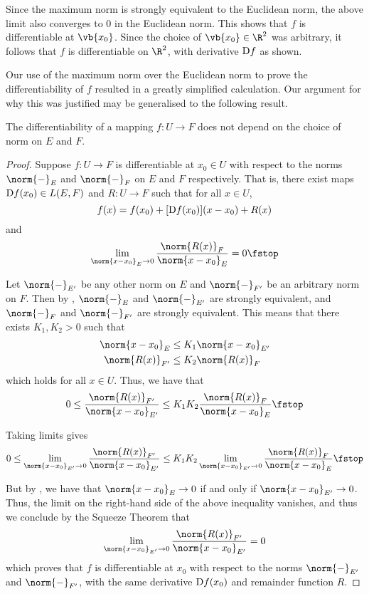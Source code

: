 Since the maximum norm is strongly equivalent to the Euclidean norm, the above limit also converges to 0 in the Euclidean norm. This shows that \( f \) is differentiable at \( \vb{x_0} \). Since the choice of \( \vb{x_0}\in\R^2 \) was arbitrary, it follows that \( f \) is differentiable on \( \R^2 \), with derivative \( \text{D} f \) as  shown.

\vspace{3mm}

Our use of the maximum norm over the Euclidean norm to prove the differentiability of \( f \) resulted in a greatly simplified calculation. Our argument for why this was justified may be generalised to the following result.

\begin{proposition}
  \label{thm:diff-norm-inv}
  The differentiability of a mapping \( f:U\to F \) does not depend on the choice of norm on \( E \) and \( F \).
\end{proposition}
\begin{proof}
  Suppose \( f:U\to F \) is differentiable at \( x_0\in U \) with respect to the norms \( \norm{-}_E \) and \( \norm{-}_F \) on \( E \) and \( F \) respectively. That is, there exist maps \( \text{D} f(x_0)\in L(E,F) \) and \( R:U\to F \) such that for all \( x\in U \),
  \[ f(x)=f(x_0)+[\text{D} f(x_0)](x-x_0)+R(x) \]
  and
  \[ \lim_{\norm{x-x_0}_E\to 0}\frac{\norm{R(x)}_F}{\norm{x-x_0}_E}=0\fstop \]

  Let \( \norm{-}_{E'} \) be any other norm on \( E \) and \( \norm{-}_{F'} \) be an arbitrary norm on \( F \). Then by , \( \norm{-}_E\) and \( \norm{-}_{E'} \) are strongly equivalent, and \( \norm{-}_F \) and \( \norm{-}_{F'} \) are strongly equivalent. This means that there exists \( K_1,K_2>0 \) such that
  \begin{align*}
    \norm{x-x_0}_E&\leq K_1\norm{x-x_0}_{E'}\\
    \norm{R(x)}_{F'}&\leq K_2\norm{R(x)}_F
  \end{align*}
  which holds for all \( x\in U \). Thus, we have that
  \[ 0\leq \frac{\norm{R(x)}_{F'}}{\norm{x-x_0}_{E'}}\leq K_1K_2\frac{\norm{R(x)}_F}{\norm{x-x_0}_E}\fstop \]

  Taking limits gives
  \[  0\leq \lim_{\norm{x-x_0}_{E'}\to 0}\frac{\norm{R(x)}_{F'}}{\norm{x-x_0}_{E'}}\leq K_1K_2\lim_{\norm{x-x_0}_{E'}\to 0}\frac{\norm{R(x)}_F}{\norm{x-x_0}_E}\fstop \]

  But by , we have that \( \norm{x-x_0}_E\to 0 \) if and only if \( \norm{x-x_0}_{E'}\to 0 \). Thus, the limit on the right-hand side of the above inequality vanishes, and thus we conclude by the Squeeze Theorem that
  \[ \lim_{\norm{x-x_0}_{E'}\to 0}\frac{\norm{R(x)}_{F'}}{\norm{x-x_0}_{E'}}=0 \]
  which proves that \( f \) is differentiable at \( x_0 \) with respect to the norms \( \norm{-}_{E'} \) and \( \norm{-}_{F'} \), with the same derivative \( \text{D} f(x_0) \) and remainder function \( R \).
\end{proof}

